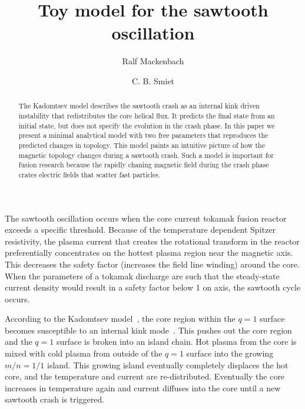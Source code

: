 \documentclass[%
superscriptaddress,
amsmath,amssymb,
aps,
pre,
floatfix,
]{revtex4-2}
\begin{document}
\title{Toy model for the sawtooth oscillation}
\author{Ralf Mackenbach}
\author{C. B. Smiet}

\begin{abstract}
The Kadomtsev model describes the sawtooth crash as an internal kink driven instability that redistributes the core helical flux. 
It predicts the final state from an initial state, but does not specify the evolution in the crash phase. 
In this paper we present a minimal analytical model with two free parameters that reproduces the predicted changes in topology. 
This model paints an intuitive picture of how the magnetic topology changes during a sawtooth crash. 
Such a model is important for fusion research because the rapidly chaning magnetic field during the crash phase crates electric fields that scatter fast particles. 
\end{abstract}
\maketitle

The sawtooth oscillation occurs when the core current tokamak fusion reactor exceeds a specific threshold. 
Because of the temperature dependent Spitzer resistivity, the plasma current that creates the rotational transform in the reactor preferentially concentrates on the hottest plasma region near the magnetic axis. 
This decreases the safety factor (increases the field line winding) around the core. 
When the parameters of a tokamak discharge are such that the steady-state current density would result in a safety factor below 1 on axis, the sawtooth cycle occurs. 

According to the Kadomtsev model~\cite{kadomtsev1975disruptive}, the core region within the $q=1$ surface becomes susceptible to an internal kink mode~\cite{coppi1976resistive}. 
This pushes out the core region and the $q=1$ surface is broken into an island chain. 
Hot plasma from the core is mixed with cold plasma from outside of the $q=1$ surface into the growing $m/n=1/1$ island. 
This growing island eventually completely displaces the hot core, and the temperature and current are re-distributed. 
Eventually the core increases in temperature again and current diffuses into the core until a new sawtooth crash is triggered. 





\end{document}
